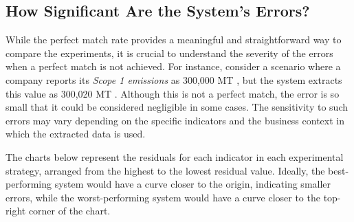 \documentclass[english, 12pt, a4paper, elec, utf8, a-2b, online]{aaltothesis}
\begin{document}
\subsection{How Significant Are the System's Errors?}

While the perfect match rate provides a meaningful and straightforward way to compare the experiments, it is crucial to understand the severity of the errors when a perfect match is not achieved.
For instance, consider a scenario where a company reports its \textit{Scope 1 emissions} as 300,000 MT , but the system extracts this value as 300,020 MT .
Although this is not a perfect match, the error is so small that it could be considered negligible in some cases.
The sensitivity to such errors may vary depending on the specific indicators and the business context in which the extracted data is used.

The charts below represent the residuals for each indicator in each experimental strategy, arranged from the highest to the lowest residual value.
Ideally, the best-performing system would have a curve closer to the origin, indicating smaller errors, while the worst-performing system would have a curve closer to the top-right corner of the chart.
\end{document}
